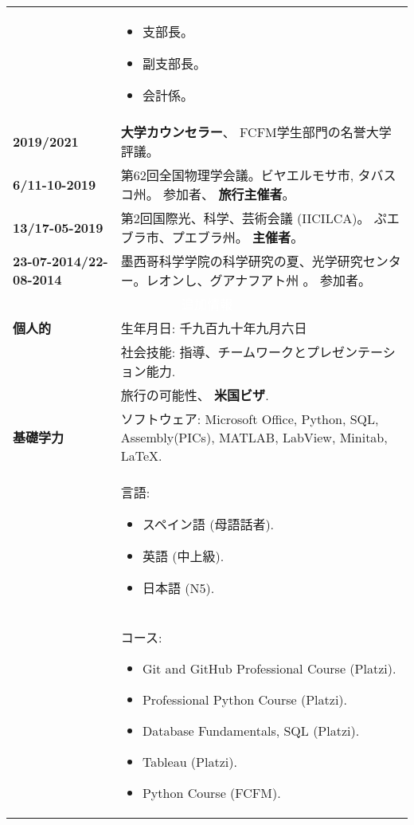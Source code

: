 \documentclass[twoside,letter,openright,10pt]{report}
\begin{document}
\begin{CJK}{UTF8}{goth}
\begin{table}[hbt!]
\begin{tabular}{p{40mm}p{140mm}}
& \vspace{-2mm}
\begin{itemize}[noitemsep,nolistsep]
\item 支部長。
\item 副支部長。
\item 会計係。
\vspace{-4mm}
\end{itemize}
\\
\textbf{2019/2021} & \textbf{大学カウンセラー}、 FCFM学生部門の名誉大学評議。
\\
\textbf{6/11-10-2019} &第62回全国物理学会議。ビヤエルモサ市, タバスコ州。 参加者、 \textbf{旅行主催者}。
\\
\textbf{13/17-05-2019} &第2回国際光、科学、芸術会議 (IICILCA)。 ぷエブラ市、プエブラ州。 \textbf{主催者}。
\\
\textbf{23-07-2014/22-08-2014} & 墨西哥科学学院の科学研究の夏、光学研究センター。レオンし、グアナフアト州 。 参加者。
\\
\multicolumn{2}{c}{\cellcolor{black} \textcolor{white}{追加情報}}
\\
\textbf{個人的} &  生年月日: 千九百九十年九月六日
\\
& 社会技能: 指導、チームワークとプレゼンテーション能力.
\\
& 旅行の可能性、 \textbf{米国ビザ}.
\\
\textbf{基礎学力}
& ソフトウェア: Microsoft Office, Python, SQL, Assembly(PICs), MATLAB, LabView, Minitab, \LaTeX{}.
\\
& 言語:
\begin{itemize}[noitemsep,nolistsep]
\item スペイン語 (母語話者).
\item 英語 (中上級).
\item 日本語 (N5).
\vspace{-4mm}
\end{itemize}
\\
& コース:
\begin{itemize}[noitemsep,nolistsep]
\item Git and GitHub Professional Course (Platzi).
\item Professional Python Course (Platzi).
\item Database Fundamentals, SQL (Platzi).
\item Tableau (Platzi).
\item Python Course (FCFM).
\vspace{-4mm}
\end{itemize}
\end{tabular}
\end{table}
\end{CJK}
\end{document}
